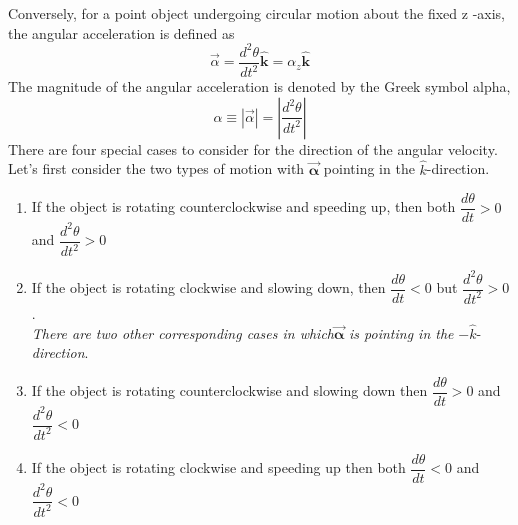 \documentclass[12pt,addpoints]{exam}
\begin{document}
	Conversely, for a point object undergoing circular motion about the fixed z -axis, the angular acceleration is defined as
	$$\vec{\alpha}=\frac{d^{2} \theta}{d t^{2}} \hat{\mathbf{k}}=\alpha_{z} \hat{\mathbf{k}}$$
	 The magnitude of the angular acceleration is denoted by the Greek symbol alpha,
	 $$\alpha \equiv|\vec{\alpha}|=\left|\frac{d^{2} \theta}{d t^{2}}\right|$$
	 There are four special cases to consider for the direction of the angular velocity. Let’s first consider the two types of motion with $\overrightarrow{\boldsymbol{\alpha}}$ pointing in the $\hat{k}$-direction.
	 \begin{enumerate}[label=(\roman*)]
	 	\item If the object is rotating counterclockwise and speeding up, then both $\dfrac{d\theta}{dt}>0$ and $\dfrac{d^2\theta}{dt^2}>0$
	 	\item If the object is rotating clockwise and slowing down, then  $\dfrac{d\theta}{dt}<0$ but $\dfrac{d^2\theta}{dt^2}>0$. \\
		\textit{There are two other corresponding cases in which}$\overrightarrow{\boldsymbol{\alpha}}$ \textit{is pointing in the} $-\hat{k}$-\textit{direction}.
		\item If the object is rotating counterclockwise and slowing down then  $\dfrac{d\theta}{dt}>0$ and $\dfrac{d^2\theta}{dt^2}<0$
		\item If the object is rotating clockwise and speeding up then both  $\dfrac{d\theta}{dt}<0$ and $\dfrac{d^2\theta}{dt^2}<0$
	 \end{enumerate}
	
\end{document}
